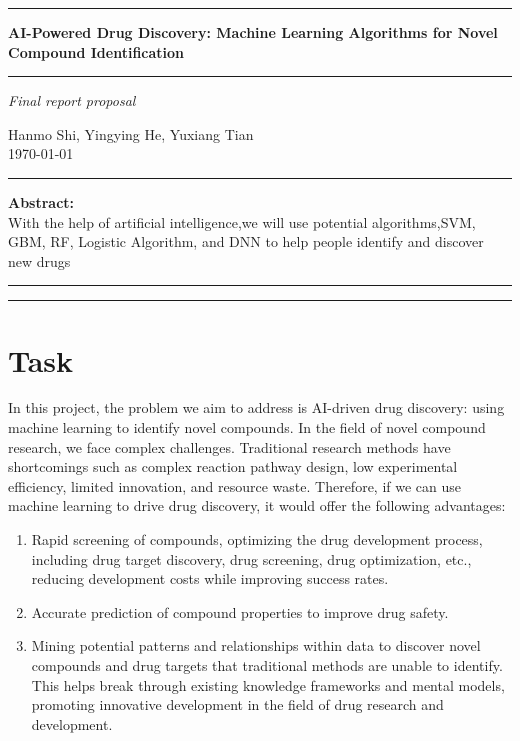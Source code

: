 \documentclass{ctexart}
\begin{document}
\hrule
\vspace{0.1em}  %

\begin{center}
    {\LARGE \textbf{AI-Powered Drug Discovery: Machine Learning Algorithms for Novel Compound Identification}} \\[1em]
    \vspace{0.1em}  %
    \hrule
    \begin{flushright}  %
        \textit{\small Final report proposal}  %
    \end{flushright}
    {\large Hanmo Shi, Yingying He, Yuxiang Tian} \\[0.5em]
    {\large \today}
\end{center}




\hrule
\vspace{1em}
\noindent
\textbf{\LARGE Abstract:} \\
{\Large  %
With the help of artificial intelligence,we will use potential algorithms,SVM, GBM, RF, Logistic Algorithm, and DNN to help people identify and discover new drugs
}

\vspace{1em}
\hrule
\tableofcontents

\vspace{1em}
\hrule
\section{Task}

In this project, the problem we aim to address is AI-driven drug discovery: using machine learning to identify novel compounds. In the field of novel compound research, we face complex challenges. Traditional research methods have shortcomings such as complex reaction pathway design, low experimental efficiency, limited innovation, and resource waste. Therefore, if we can use machine learning to drive drug discovery, it would offer the following advantages:
\begin{enumerate}[itemsep=1pt, parsep=1pt]
    \item Rapid screening of compounds, optimizing the drug development process, including drug target discovery, drug screening, drug optimization, etc., reducing development costs while improving success rates.
    \item Accurate prediction of compound properties to improve drug safety.
    \item Mining potential patterns and relationships within data to discover novel compounds and drug targets that traditional methods are unable to identify. This helps break through existing knowledge frameworks and mental models, promoting innovative development in the field of drug research and development.
\end{enumerate}
\end{document}
